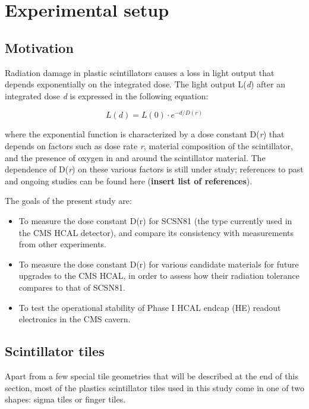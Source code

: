 \section{Experimental setup\label{sec:setup}}

\subsection{Motivation\label{sec:setup-motivation}}

Radiation damage in plastic scintillators causes a loss in light output that depends exponentially on the integrated dose. The light output L(\textit{d}) after an integrated dose \textit{d} is expressed in the following equation:

\begin{equation}
L(\textit{d}) = L(0)\cdot e^{-d/D(\textit{r})}
\label{eq:lightloss}
\end{equation}

where the exponential function is characterized by a dose constant D(\textit{r}) that depends on factors such as dose rate \textit{r}, material composition of the scintillator, and the presence of oxygen in and around the scintillator material. The dependence of D(\textit{r}) on these various factors is still under study; references to past and ongoing studies can be found here (\textbf{insert list of references}).

The goals of the present study are:

\begin{itemize}
\item To measure the dose constant D(r) for SCSN81 (the type currently used in the CMS HCAL detector), and compare its consistency with measurements from other experiments.
\item To measure the dose constant D(r) for various candidate materials for future upgrades to the CMS HCAL, in order to assess how their radiation tolerance compares to that of SCSN81.
\item To test the operational stability of Phase I HCAL endcap (HE) readout electronics in the CMS cavern.
\end{itemize}

\subsection{Scintillator tiles\label{sec:setup-tiles}}

Apart from a few special tile geometries that will be described at the end of this section, most of the plastics scintillator tiles used in this study come in one of two shapes: sigma tiles or finger tiles.

